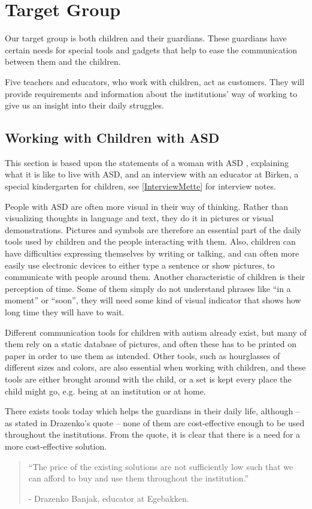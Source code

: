 \section{Target Group}
Our target group is both children and their guardians. These guardians have certain needs for special tools and gadgets that help to ease the communication between them and the children.

Five teachers and educators, who work with children, act as customers. They will provide requirements and information about the institutions' way of working to give us an insight into their daily struggles.

\subsection{Working with Children with ASD}
This section is based upon the statements of a woman with ASD \cite{autism.com}, explaining what it is like to live with ASD, and an interview with an educator at Birken, a special kindergarten for children, see \autoref{InterviewMette} for interview notes.

	People with ASD are often more visual in their way of thinking. Rather than visualizing thoughts in language and text, they do it in pictures or visual demonstrations. Pictures and symbols are therefore an essential part of the daily tools used by children and the people interacting with them. Also, children can have difficulties expressing themselves by writing or talking, and can often more easily use electronic devices to either type a sentence or show pictures, to communicate with people around them.
	Another characteristic of children is their perception of time. Some of them simply do not understand phrases like ``in a moment'' or ``soon'', they will need some kind of visual indicator that shows how long time they will have to wait.

Different communication tools for children with autism already exist, but many of them rely on a static database of pictures, and often these has to be printed on paper in order to use them as intended. Other tools, such as hourglasses of different sizes and colors, are also essential when working with children, and these tools are either brought around with the child, or a set is kept every place the child might go, e.g. being at an institution or at home.

There exists tools today which helps the guardians in their daily life, although -- as stated in Drazenko's quote -- none of them are cost-effective enough to be used throughout the institutions. From the quote, it is clear that there is a need for a more cost-effective solution.

\begin{quotation}
``The price of the existing solutions are not sufficiently low such that we can afford to buy and use them throughout the institution.''\\ 
	\begin{flushright}
		- Drazenko Banjak, educator at Egebakken.
	\end{flushright}
\end{quotation}